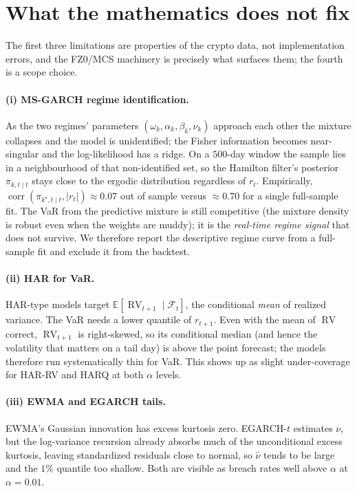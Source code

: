 \documentclass[11pt,a4paper]{article}
\newcommand{\E}{\mathbb{E}}
\newcommand{\RV}{\operatorname{RV}}
\newcommand{\Fcal}{\mathcal{F}}
\begin{document}
\section{What the mathematics does not fix}\label{sec:limits}

The first three limitations are properties of the crypto data, not
implementation errors, and the FZ0/MCS machinery is precisely what surfaces
them; the fourth is a scope choice.

\paragraph{(i) MS-GARCH regime identification.} As the two regimes' parameters
$(\omega_k,\alpha_k,\beta_k,\nu_k)$ approach each other the mixture collapses and
the model is unidentified; the Fisher information becomes near-singular and the
log-likelihood has a ridge. On a $500$-day window the sample lies in a
neighbourhood of that non-identified set, so the Hamilton filter's posterior
$\pi_{k,t\mid t}$ stays close to the ergodic distribution regardless of $r_t$.
Empirically, $\operatorname{corr}(\pi_{k^\star,t\mid t}, |r_t|)\approx 0.07$ out
of sample versus $\approx 0.70$ for a single full-sample fit. The VaR from the
predictive mixture is still competitive (the mixture density is robust even when
the weights are muddy); it is the \emph{real-time regime signal} that does not
survive. We therefore report the descriptive regime curve from a full-sample fit
and exclude it from the backtest.

\paragraph{(ii) HAR for VaR.} HAR-type models target
$\E[\RV_{t+1}\mid\Fcal_t]$, the conditional \emph{mean} of realized variance.
The VaR needs a lower quantile of $r_{t+1}$. Even with the mean of $\RV$ correct,
$\RV_{t+1}$ is right-skewed, so its conditional median (and hence the volatility
that matters on a tail day) is above the point forecast; the models therefore
run systematically thin for VaR. This shows up as slight under-coverage for
HAR-RV and HARQ at both $\alpha$ levels.

\paragraph{(iii) EWMA and EGARCH tails.} EWMA's Gaussian innovation has excess
kurtosis zero. EGARCH-$t$ estimates $\nu$, but the log-variance recursion
already absorbs much of the unconditional excess kurtosis, leaving standardized
residuals close to normal, so $\hat\nu$ tends to be large and the $1\%$ quantile
too shallow. Both are visible as breach rates well above $\alpha$ at
$\alpha = 0.01$.
\end{document}
